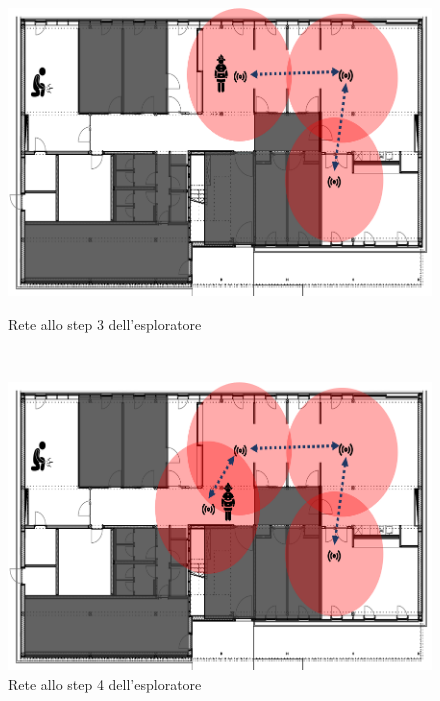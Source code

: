 \begin{figure}[h]
	\begin{minipage}[b]{6cm}
		\centering
		\includegraphics[scale=0.35]{Introduzione/intervento_step_3.png}
		\caption{Rete allo step 3 dell'esploratore}
		\label{fig:step3}
	\end{minipage}
	\ \hspace{10 mm} \
	\begin{minipage}[b]{6cm}
		\centering
		\includegraphics[scale=0.35]{Introduzione/intervento_step_4.png}
		\caption{Rete allo step 4 dell'esploratore}
		\label{fig:step4}
	\end{minipage}
\end{figure}

